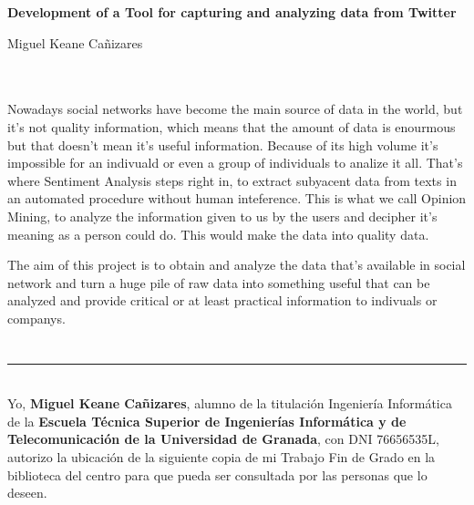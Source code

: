 \begin{center}
{\large\bfseries Development of a Tool for capturing and analyzing data from Twitter}\\
\end{center}
\begin{center}
Miguel Keane Cañizares\\
\end{center}

\\

\vspace{0.7cm}
\\

Nowadays social networks have become the main source of data in the world, but it's not quality information, which means that the amount of data is enourmous but that doesn't mean it's useful information. Because of its high volume it's impossible for an indivuald or even a group of individuals to analize it all. That's where Sentiment Analysis steps right in, to extract subyacent data from texts in an automated procedure without human inteference. This is what we call Opinion Mining, to analyze the information given to us by the users and decipher it's meaning as a person could do. This would make the data into quality data. 

The aim of this project is to obtain and analyze the data that's available in social network and turn a huge pile of raw data into something useful that can be analyzed and provide critical or at least practical information to indivuals or companys. 

\chapter*{}
\thispagestyle{empty}

\noindent\rule[-1ex]{\textwidth}{2pt}\\[4.5ex]

Yo, \textbf{Miguel Keane Cañizares}, alumno de la titulación Ingeniería Informática de la \textbf{Escuela Técnica Superior
de Ingenierías Informática y de Telecomunicación de la Universidad de Granada}, con DNI 76656535L, autorizo la
ubicación de la siguiente copia de mi Trabajo Fin de Grado en la biblioteca del centro para que pueda ser
consultada por las personas que lo deseen.

